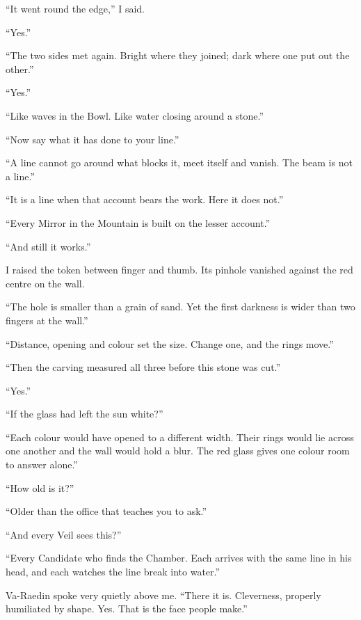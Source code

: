 ``It went round the edge,'' I said.\par
``Yes.''\par
``The two sides met again. Bright where they joined; dark where one put out the other.''\par
``Yes.''\par
``Like waves in the Bowl. Like water closing around a stone.''\par
``Now say what it has done to your line.''\par
``A line cannot go around what blocks it, meet itself and vanish. The beam is not a line.''\par
``It is a line when that account bears the work. Here it does not.''\par
``Every Mirror in the Mountain is built on the lesser account.''\par
``And still it works.''\par

I raised the token between finger and thumb. Its pinhole vanished against the red centre on the wall.\par

``The hole is smaller than a grain of sand. Yet the first darkness is wider than two fingers at the wall.''\par
``Distance, opening and colour set the size. Change one, and the rings move.''\par
``Then the carving measured all three before this stone was cut.''\par
``Yes.''\par
``If the glass had left the sun white?''\par
``Each colour would have opened to a different width. Their rings would lie across one another and the wall would hold a blur. The red glass gives one colour room to answer alone.''\par
``How old is it?''\par
``Older than the office that teaches you to ask.''\par
``And every Veil sees this?''\par
``Every Candidate who finds the Chamber. Each arrives with the same line in his head, and each watches the line break into water.''\par

Va-Raedin spoke very quietly above me. ``There it is. Cleverness, properly humiliated by shape. Yes. That is the face people make.''\par

\ornament

